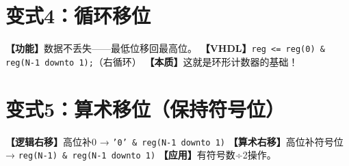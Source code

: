 \section{变式4：循环移位}

\begin{detailbox}[完整教学]
\textbf{【功能】}数据不丢失——最低位移回最高位。
\textbf{【VHDL】}\texttt{reg <= reg(0) \& reg(N-1 downto 1);}（右循环）
\textbf{【本质】}这就是环形计数器的基础！
\end{detailbox}


\section{变式5：算术移位（保持符号位）}

\begin{detailbox}[完整教学]
\textbf{【逻辑右移】}高位补0 → \texttt{'0' \& reg(N-1 downto 1)}
\textbf{【算术右移】}高位补符号位 → \texttt{reg(N-1) \& reg(N-1 downto 1)}
\textbf{【应用】}有符号数÷2操作。
\end{detailbox}
